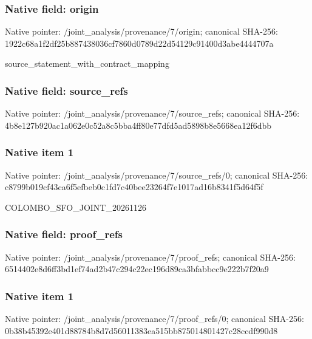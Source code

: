 \documentclass[10pt,a4paper]{article}
\begin{document}
\subsubsection{Native field: origin}


Native pointer: /joint\_analysis/provenance/7/origin; canonical SHA-256: 1922c68a1f2df25b88743803\allowbreak{}6cf7860d0789d22d54129c91\allowbreak{}400d3abe4444707a


source\_statement\_with\_contract\_mapping


\subsubsection{Native field: source\_refs}


Native pointer: /joint\_analysis/provenan\allowbreak{}ce/7/source\_refs; canonical SHA-256: 4b8e127b920ac1a062e0c52a\allowbreak{}8c5bba4ff80e77dfd5ad5898\allowbreak{}b8e5668ea12f6dbb



\subsubsection{Native item 1}


Native pointer: /joint\_analysis/provenan\allowbreak{}ce/7/source\_refs/0; canonical SHA-256: c8799b019cf43ca6f5efbeb0\allowbreak{}c1fd7c40bee23264f7e1017a\allowbreak{}d16b8341f5d64f5f


COLOMBO\_SFO\_JOINT\_20261126


\subsubsection{Native field: proof\_refs}


Native pointer: /joint\_analysis/provenance/7/proof\_refs; canonical SHA-256: 6514402e8d6ff3bd1ef74ad2\allowbreak{}b47c294c22ec196d89ca3bfa\allowbreak{}bbcc9e222b7f20a9



\subsubsection{Native item 1}


Native pointer: /joint\_analysis/provenan\allowbreak{}ce/7/proof\_refs/0; canonical SHA-256: 0b38b45392e401d88784b8d7\allowbreak{}d56011383ea515bb87501480\allowbreak{}1427c28ccdf990d8
\end{document}
